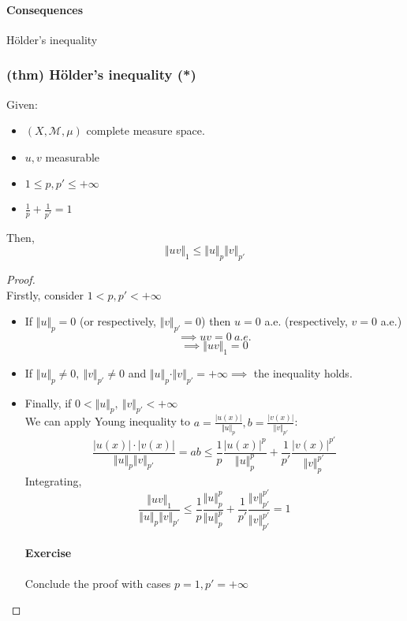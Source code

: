 \paragraph{Consequences}
Hölder's inequality
\subsubsection{(thm) Hölder's inequality (*)}
Given:
\begin{itemize}
    \item $(X, \mathcal M,\mu)$ complete measure space.
    \item $u,v$ measurable
    \item $1\leq p,p'\leq +\infty$
    \item $\frac 1p +\frac 1{p'}=1$
\end{itemize}
Then, $$\Vert uv\Vert_1 \leq \Vert u\Vert_p\Vert v\Vert_{p'}$$
\begin{proof} \ \\
    Firstly, consider $1<p,p'<+\infty$
    \begin{itemize}
        \item If $\Vert u\Vert_p =0$ (or respectively, $\Vert v\Vert_{p'}=0$) then $u=0$ a.e. (respectively, $v=0$ a.e.)
    $$\implies uv=0 \ a.e.$$
    $$\implies \Vert uv\Vert_1 =0$$
    \item If $\Vert u\Vert_p\neq0, \ \Vert v\Vert_{p'}\neq 0$ and $\Vert u\Vert_p\cdot \Vert v\Vert_{p'}=+\infty\implies$ the inequality holds.
    \item Finally, if $0<\Vert u\Vert_p, \ \Vert v\Vert_{p'}<+\infty$\\
    We can apply Young inequality to $a=\frac{|u(x)|}{\Vert u\Vert_p}, b =\frac{|v(x)|}{\Vert v\Vert_{p'}}$:
    $$\frac{|u(x)|\cdot |v(x)|}{\Vert u\Vert_p\Vert v\Vert_{p'}}=ab\leq \frac 1p \frac{|u(x)|^p}{\Vert u\Vert_p^p}+\frac 1{p'}\frac{|v(x)|^{p'}}{\Vert v\Vert_p^{p'}}$$
    Integrating,
    $$\frac{\Vert uv\Vert_1}{\Vert u\Vert_p\Vert v\Vert_{p'}}\leq \frac{1}{p}\frac{\Vert u\Vert_p^p}{\Vert u\Vert_p^p}+\frac 1{p'}\frac{\Vert v\Vert_{p'}^{p'}}{\Vert v\Vert_{p'}^{p'}}=1$$
    \paragraph{Exercise}
    Conclude the proof with cases $p=1, p'=+\infty$
    \end{itemize}
\end{proof}
